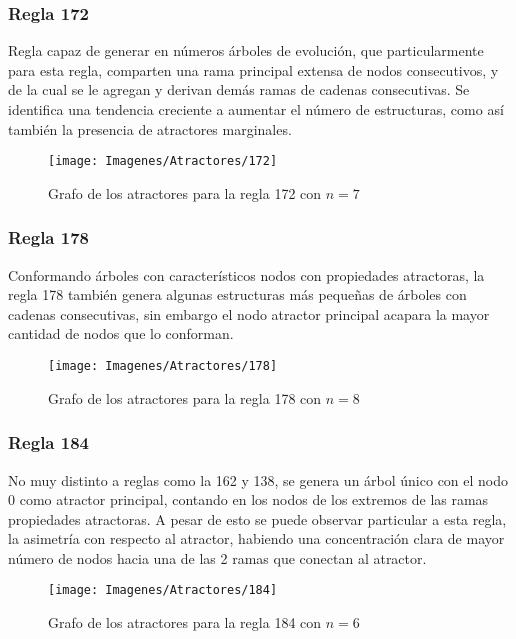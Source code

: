 \documentclass[]{article}
\begin{document}
			\newpage
			\subsubsection{Regla 172}
				\justifying
				Regla capaz de generar en números árboles de evolución, que particularmente para esta regla, comparten una rama principal extensa de nodos consecutivos, y de la cual se le agregan y derivan demás ramas de cadenas consecutivas. Se identifica una tendencia creciente a aumentar el número de estructuras, como así también la presencia de atractores marginales.
				
				\hfill\break
				\hfill\break
				\begin{figure}[!h]
					\centering
					\texttt{[image: Imagenes/Atractores/172]}
					\caption{Grafo de los atractores para la regla 172 con $n=7$}
					\label{Regla_172}
				\end{figure}
			
			\newpage
			\subsubsection{Regla 178}
				\justifying
				Conformando árboles con característicos nodos con propiedades atractoras, la regla 178 también genera algunas estructuras más pequeñas de árboles con cadenas consecutivas, sin embargo el nodo atractor principal acapara la mayor cantidad de nodos que lo conforman.
				
				\hfill\break
				\hfill\break
				\begin{figure}[!h]
					\centering
					\texttt{[image: Imagenes/Atractores/178]}
					\caption{Grafo de los atractores para la regla 178 con $n=8$}
					\label{Regla_178}
				\end{figure}
			
			
			\newpage
			\subsubsection{Regla 184}
				\justifying
				No muy distinto a reglas como la 162 y 138, se genera un árbol único con el nodo 0 como atractor principal, contando en los nodos de los extremos de las ramas propiedades atractoras. A pesar de esto se puede observar particular a esta regla, la asimetría con respecto al atractor, habiendo una concentración clara de mayor número de nodos hacia una de las 2 ramas que conectan al atractor.
				
				\hfill\break
				\hfill\break
				\begin{figure}[!h]
					\centering
					\texttt{[image: Imagenes/Atractores/184]}
					\caption{Grafo de los atractores para la regla 184 con $n=6$}
					\label{Regla_184}
				\end{figure}
			
\end{document}
